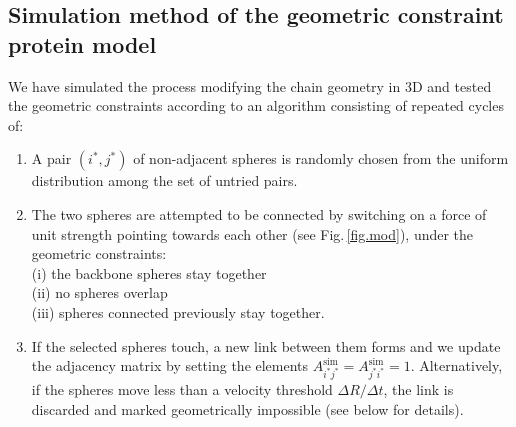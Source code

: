\documentclass[9pt]{elife}
\begin{document}
\subsection{Simulation method of the geometric constraint protein model}
We have simulated the process modifying the chain geometry in 3D and tested the geometric constraints according to an algorithm consisting of repeated cycles of:
\begin{enumerate}
 \item A pair $(i^*,j^*)$ of non-adjacent spheres is randomly chosen from the uniform distribution among the set of untried pairs.
 \item The two spheres are attempted to be connected by switching on a force of unit strength pointing towards each other (see Fig.\,\ref{fig.mod}), under the geometric constraints:\\
 (i) the backbone spheres stay together\\
(ii) no spheres overlap\\
(iii) spheres connected previously stay together.
\item If the selected spheres touch, a new link between them forms and we update the adjacency matrix by setting the elements $A_{i^*j^*}^{\text{sim}}=A_{j^*i^*}^{\text{sim}}=1$. Alternatively, if the spheres move less than a velocity threshold $\Delta R/\Delta t$, the link is discarded and marked geometrically impossible (see below for details).
\end{enumerate}
\end{document}
